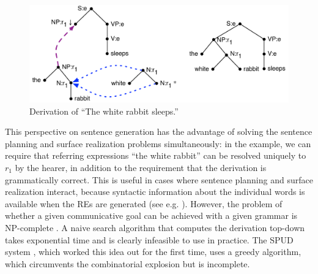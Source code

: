 \begin{figure}[t]
  \centering
  \includegraphics[width=0.75\columnwidth]{pic-derivation}
  \caption{Derivation of ``The white rabbit sleeps.''}
  \label{fig:white-rabbit-sleeps-deriv}
\end{figure}

This perspective on sentence generation has the advantage of solving
the sentence planning and surface realization problems simultaneously:
in the example, we can require that referring expressions ``the white
rabbit'' can be resolved uniquely to $r_1$ by the hearer, in addition
to the requirement that the derivation is grammatically correct. This
is useful in cases where sentence planning and surface realization
interact, because syntactic information about the individual words is
available when the REs are generated (see
e.g. \cite{stone98textual}). However, the problem of whether a given
communicative goal can be achieved with a given grammar is NP-complete
\cite{KolStr02}. A naive search algorithm that computes the derivation
top-down takes exponential time and is clearly infeasible to use in
practice. The SPUD system \cite{Stone2003a}, which worked this idea
out for the first time, uses a greedy algorithm, which circumvents the
combinatorial explosion but is incomplete.

